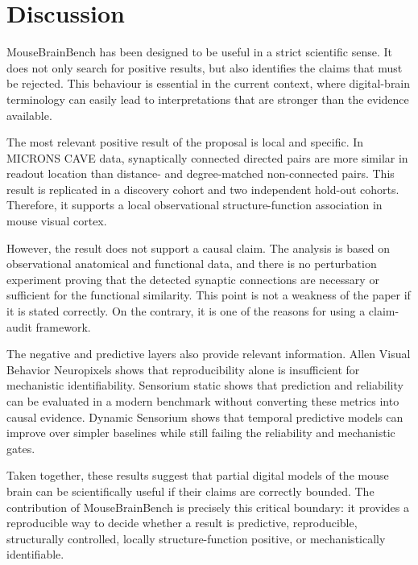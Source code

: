 \section{Discussion}

MouseBrainBench has been designed to be useful in a strict scientific sense. It
does not only search for positive results, but also identifies the claims that
must be rejected. This behaviour is essential in the current context, where
digital-brain terminology can easily lead to interpretations that are stronger
than the evidence available.

The most relevant positive result of the proposal is local and specific. In
MICRONS CAVE data, synaptically connected directed pairs are more similar in
readout location than distance- and degree-matched non-connected pairs. This
result is replicated in a discovery cohort and two independent hold-out cohorts.
Therefore, it supports a local observational structure-function association in
mouse visual cortex.

However, the result does not support a causal claim. The analysis is based on
observational anatomical and functional data, and there is no perturbation
experiment proving that the detected synaptic connections are necessary or
sufficient for the functional similarity. This point is not a weakness of the
paper if it is stated correctly. On the contrary, it is one of the reasons for
using a claim-audit framework.

The negative and predictive layers also provide relevant information. Allen
Visual Behavior Neuropixels shows that reproducibility alone is insufficient for
mechanistic identifiability. Sensorium static shows that prediction and
reliability can be evaluated in a modern benchmark without converting these
metrics into causal evidence. Dynamic Sensorium shows that temporal predictive
models can improve over simpler baselines while still failing the reliability
and mechanistic gates.

Taken together, these results suggest that partial digital models of the mouse
brain can be scientifically useful if their claims are correctly bounded. The
contribution of MouseBrainBench is precisely this critical boundary: it provides
a reproducible way to decide whether a result is predictive, reproducible,
structurally controlled, locally structure-function positive, or
mechanistically identifiable.
